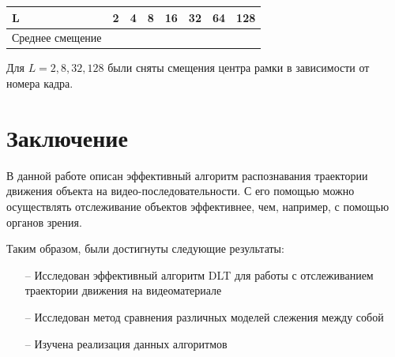 \documentclass[14pt, a4paper]{article}
\begin{document}
\begin{table}[h]
\centering
\begin{tabular}{|l|l|l|l|l|l|l|l|}
\hline
L                    & 2 & 4 & 8 & 16 & 32 & 64 & 128 \\ \hline
Среднее смещение     &   &   &   &    &    &    &     \\ \hline
\end{tabular}
\end{table}

Для $L = 2, 8, 32, 128$ были сняты смещения центра рамки в зависимости от номера кадра. 

\newpage
\section*{Заключение}
В данной работе описан эффективный алгоритм распознавания траектории движения объекта на видео-последовательности. С его помощью можно осуществлять отслеживание объектов эффективнее, чем, например, с помощью органов зрения. 

Таким образом, были достигнуты следующие результаты:
\begin{itemize}[leftmargin=0em, itemindent=2.5 em,itemsep=1.5 pt,parsep=1.5 pt]
    \item[--] Исследован эффективный алгоритм DLT для работы с отслеживанием траектории движения на видеоматериале
    \item[--] Исследован метод сравнения различных моделей слежения между собой
    \item[--] Изучена реализация данных алгоритмов 
    
\end{itemize}


\newpage 
\end{document}
